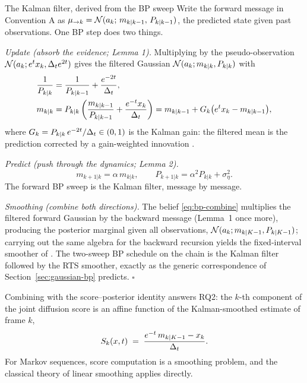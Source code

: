 \begin{toolbox}{The Kalman filter, derived from the BP sweep}
Write the forward message in Convention A as
$\mu_{\to k} = \mathcal{N}(a_k;\, m_{k|k-1},\, P_{k|k-1})$, the predicted state
given past observations. One BP step does two things.

\emph{Update (absorb the evidence; Lemma 1).} Multiplying by the
pseudo-observation $\mathcal{N}(a_k; e^t x_k, \Delta_t e^{2t})$ gives the filtered
Gaussian $\mathcal{N}(a_k; m_{k|k}, P_{k|k})$ with
\begin{align*}
  \frac{1}{P_{k|k}} &= \frac{1}{P_{k|k-1}} + \frac{e^{-2t}}{\Delta_t},\\
  m_{k|k} &= P_{k|k} \left( \frac{m_{k|k-1}}{P_{k|k-1}}
        + \frac{e^{-t} x_k}{\Delta_t} \right)
  = m_{k|k-1} + G_k \big( e^{t} x_k - m_{k|k-1} \big),
\end{align*}
where $G_k = P_{k|k}\, e^{-2t}/\Delta_t \in (0,1)$ is the Kalman gain: the
filtered mean is the prediction corrected by a gain-weighted innovation
\citep{kalman1960new}.

\emph{Predict (push through the dynamics; Lemma 2).}
\begin{equation*}
  m_{k+1|k} = \alpha\, m_{k|k},
  \qquad
  P_{k+1|k} = \alpha^2 P_{k|k} + \sigma_\eta^2 .
\end{equation*}
The forward BP sweep is the Kalman filter, message by message.

\emph{Smoothing (combine both directions).} The belief
\eqref{eq:bp-combine} multiplies the filtered forward Gaussian by the
backward message (Lemma~1 once more), producing the posterior marginal
given all observations, $\mathcal{N}(a_k; m_{k|K-1}, P_{k|K-1})$; carrying out
the same algebra for the backward recursion yields the fixed-interval
smoother of \citet{rauch1965maximum}. The two-sweep BP schedule on the
chain is the Kalman filter followed by the RTS smoother, exactly as the
generic correspondence of Section~\ref{sec:gaussian-bp} predicts.
\hfill$\square$
\end{toolbox}

Combining with the score--posterior identity answers RQ2: the $k$-th
component of the joint diffusion score is an affine function of the
Kalman-smoothed estimate of frame $k$,
\begin{equation}
  S_k(x, t)
  \;=\; \frac{e^{-t}\, m_{k|K-1} - x_k}{\Delta_t} .
  \label{eq:bp-score-kalman}
\end{equation}
For Markov sequences, score computation is a smoothing problem, and the
classical theory of linear smoothing applies directly.


